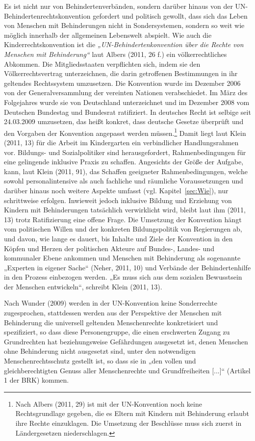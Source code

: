 Es ist nicht nur von Behindertenverbänden, sondern darüber hinaus von der UN-Behindertenrechtskonvention gefordert und politisch gewollt, dass sich das Leben von Menschen mit Behinderungen nicht in Sondersystemen, sondern so weit wie möglich innerhalb der allgemeinen Lebenswelt abspielt. Wie auch die Kinderrechtskonvention ist die \emph{„UN-Behindertenkonvention über die Rechte von Menschen mit Behinderung“} laut Albers (2011, 26 f.) ein völkerrechtliches Abkommen. Die Mitgliedsstaaten verpflichten sich, indem sie den Völkerrechtsvertrag unterzeichnen, die darin getroffenen Bestimmungen in ihr geltendes Rechtssystem umzusetzen. Die Konvention wurde im Dezember 2006 von der Generalversammlung der vereinten Nationen verabschiedet. Im März des Folgejahres wurde sie von Deutschland unterzeichnet und im Dezember 2008 vom Deutschen Bundestag und Bundesrat ratifiziert. In deutsches Recht ist selbige seit 24.03.2009 umzusetzen, das heißt konkret, dass deutsche Gesetze überprüft und den Vorgaben der Konvention angepasst werden müssen.\footnote{Nach Albers (2011, 29) ist mit der UN-Konvention noch keine Rechtsgrundlage gegeben, die es Eltern mit Kindern mit Behinderung erlaubt ihre Rechte einzuklagen. Die Umsetzung der Beschlüsse muss sich zuerst in Ländergesetzen niederschlagen.} Damit liegt laut Klein (2011, 13) für die Arbeit im Kindergarten ein verbindlicher Handlungsrahmen vor. Bildungs- und Sozialpolitiker sind herausgefordert, Rahmenbedingungen für eine gelingende inklusive Praxis zu schaffen. Angesichts der Größe der Aufgabe, kann, laut Klein (2011, 91), das Schaffen geeigneter Rahmenbedingungen, welche sowohl personalintensive als auch fachliche und räumliche Voraussetzungen und darüber hinaus noch weitere Aspekte umfasst (vgl. Kapitel~\ref{sec:Wie}), nur schrittweise erfolgen. Inwieweit jedoch inklusive Bildung und Erziehung von Kindern mit Behinderungen tatsächlich verwirklicht wird, bleibt laut ihm (2011, 13) trotz Ratifizierung eine offene Frage. Die Umsetzung der Konvention hängt vom politischen Willen und der konkreten Bildungspolitik von Regierungen ab, und davon, wie lange es dauert, bis Inhalte und Ziele der Konvention in den Köpfen und Herzen der politischen Akteure auf Bundes-, Landes- und kommunaler Ebene ankommen und Menschen mit Behinderung als sogenannte „Experten in eigener Sache“ (Neher, 2011, 10) und Verbände der Behindertenhilfe in den Prozess einbezogen werden. „Es muss sich aus dem sozialen Bewusstsein der Menschen entwickeln“, schreibt Klein (2011, 13). 

Nach Wunder (2009) werden in der UN-Konvention keine Sonderrechte zugesprochen, stattdessen werden aus der Perspektive der Menschen mit Behinderung die universell geltenden Menschenrechte konkretisiert und spezifiziert, so dass diese Personengruppe, die einen erschwerten Zugang zu Grundrechten hat beziehungsweise Gefährdungen ausgesetzt ist, denen Menschen ohne Behinderung nicht ausgesetzt sind, unter den notwendigen Menschenrechtsschutz gestellt ist, so dass sie in „den vollen und gleichberechtigten Genuss aller Menschenrechte und Grundfreiheiten [...]“ (Artikel 1 der BRK) kommen.

